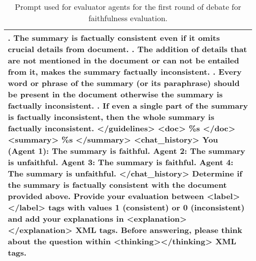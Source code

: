 \begin{table*}
\begin{tabular}{@{}p{14cm}@{}}
    \newline
    10. The summary is factually consistent even if it omits crucial details from document.
    \newline
    11. The addition of details that are not mentioned in the document or can not be entailed from it, makes the summary factually inconsistent.
    \newline
    12. Every word or phrase of the summary (or its paraphrase) should be present in the document otherwise the summary is factually inconsistent.
    \newline
    13. If even a single part of the summary is factually inconsistent, then the whole summary is factually inconsistent.
    \newline
    </guidelines>
\newline
\newline
    <doc>
    \newline
    \%s
    \newline
    </doc>
    \newline
    \newline
    <summary>
    \newline
    \%s
    \newline
    </summary>
    \newline
    \newline
    <chat\_history>
    \newline
    You (Agent 1): The summary is faithful.
    \newline
    Agent 2: The summary is unfaithful.
    \newline
    Agent 3: The summary is faithful.
    \newline
    Agent 4: The summary is unfaithful.
    \newline
    </chat\_history>
    \newline
    \newline
    Determine if the summary is factually consistent with the document provided above. Provide your evaluation between <label></label> tags with values 1 (consistent) or 0 (inconsistent) and add your explanations in <explanation></explanation> XML tags. Before answering, please think about the question within <thinking></thinking> XML tags.
    \\ 
 \bottomrule
\end{tabular}
\caption{Prompt used for evaluator agents for the first round of debate for faithfulness evaluation.}
\label{tab:debate_prompt_first_round}
\end{table*}
